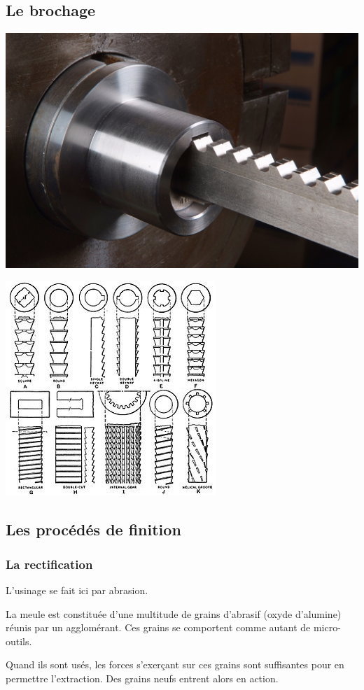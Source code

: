 \documentclass[11pt,oneside]{article}
\begin{document}
\subsection{Le brochage}
\begin{minipage}[c]{.45\linewidth}
\begin{center}
\includegraphics[width=.5\textwidth]{png/brochage1}
\end{center}
\end{minipage} \hfill
\begin{minipage}[c]{.45\linewidth}
\begin{center}
\includegraphics[width=.5\textwidth]{png/brochage2}
\end{center}
\end{minipage} 
\subsection{Les procédés de finition}
\subsubsection{La rectification}
L'usinage se fait ici par abrasion.

La meule est constituée d'une multitude de grains d'abrasif (oxyde d'alumine) réunis par un agglomérant. Ces grains se comportent comme autant de micro-outils.

Quand ils sont usés, les forces s'exerçant sur ces grains sont suffisantes pour en permettre l'extraction. Des grains neufs entrent alors en action. 
\end{document}
